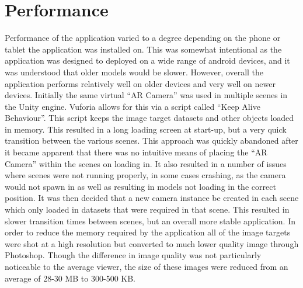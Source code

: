 \section{Performance}
Performance of the application varied to a degree depending on the phone or tablet the application was installed on. This was somewhat intentional as the application was designed to deployed on a wide range of android devices, and it was understood that older models would be slower. However, overall the application performs relatively well on older devices and very well on newer devices.
Initially the same virtual “AR Camera” was used in multiple scenes in the Unity engine. Vuforia allows for this via a script called “Keep Alive Behaviour”. This script keeps the image target datasets and other objects loaded in memory. This resulted in a long loading screen at start-up, but a very quick transition between the various scenes. This approach was quickly abandoned after it became apparent that there was no intuitive means of placing the “AR Camera” within the scenes on loading in. It also resulted in a number of issues where scenes were not running properly, in some cases crashing, as the camera would not spawn in as well as resulting in models not loading in the correct position.
It was then decided that a new camera instance be created in each scene which only loaded in datasets that were required in that scene. This resulted in slower transition times between scenes, but an overall more stable application.
In order to reduce the memory required by the application all of the image targets were shot at a high resolution but converted to much lower quality image through Photoshop. Though the difference in image quality was not particularly noticeable to the average viewer, the size of these images were reduced from an average of 28-30 MB to 300-500 KB. 

